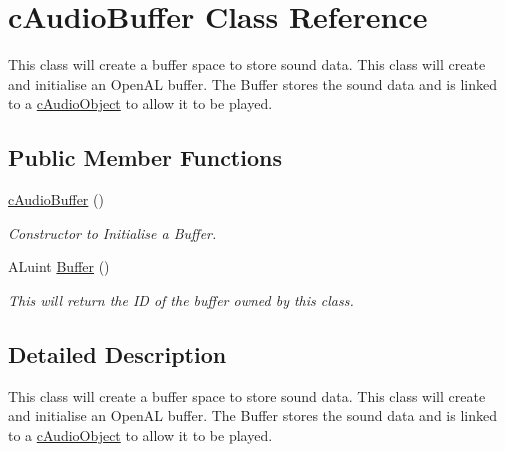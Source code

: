 \hypertarget{classc_audio_buffer}{
\section{cAudioBuffer Class Reference}
\label{classc_audio_buffer}
}


This class will create a buffer space to store sound data. This class will create and initialise an OpenAL buffer. The Buffer stores the sound data and is linked to a \hyperlink{classc_audio_object}{cAudioObject} to allow it to be played.  


\subsection*{Public Member Functions}
\begin{DoxyCompactItemize}
\item 
\hypertarget{classc_audio_buffer_adae216a1c736e8474f8db45319f97467}{
\hyperlink{classc_audio_buffer_adae216a1c736e8474f8db45319f97467}{cAudioBuffer} ()}
\label{classc_audio_buffer_adae216a1c736e8474f8db45319f97467}

\begin{DoxyCompactList}\small\item\em Constructor to Initialise a Buffer. \end{DoxyCompactList}\item 
\hypertarget{classc_audio_buffer_a4fb260df2f23cf5c8ec4b557555df89b}{
ALuint \hyperlink{classc_audio_buffer_a4fb260df2f23cf5c8ec4b557555df89b}{Buffer} ()}
\label{classc_audio_buffer_a4fb260df2f23cf5c8ec4b557555df89b}

\begin{DoxyCompactList}\small\item\em This will return the ID of the buffer owned by this class. \end{DoxyCompactList}\end{DoxyCompactItemize}


\subsection{Detailed Description}
This class will create a buffer space to store sound data. This class will create and initialise an OpenAL buffer. The Buffer stores the sound data and is linked to a \hyperlink{classc_audio_object}{cAudioObject} to allow it to be played. 